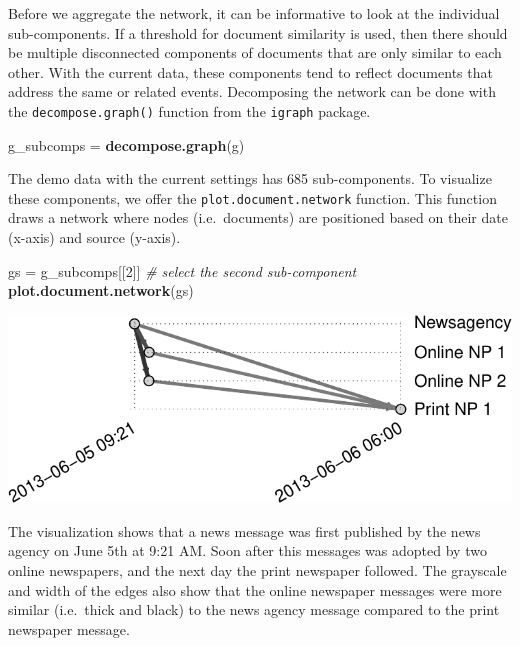 \documentclass[]{article}
\newenvironment{Shaded}{\begin{snugshade}}{\end{snugshade}}
\newcommand{\KeywordTok}[1]{\textcolor[rgb]{0.13,0.29,0.53}{\textbf{{#1}}}}
\newcommand{\DecValTok}[1]{\textcolor[rgb]{0.00,0.00,0.81}{{#1}}}
\newcommand{\StringTok}[1]{\textcolor[rgb]{0.31,0.60,0.02}{{#1}}}
\newcommand{\CommentTok}[1]{\textcolor[rgb]{0.56,0.35,0.01}{\textit{{#1}}}}
\newcommand{\NormalTok}[1]{{#1}}
\begin{document}
Before we aggregate the network, it can be informative to look at the
individual sub-components. If a threshold for document similarity is
used, then there should be multiple disconnected components of documents
that are only similar to each other. With the current data, these
components tend to reflect documents that address the same or related
events. Decomposing the network can be done with the
\texttt{decompose.graph()} function from the \texttt{igraph} package.

\begin{Shaded}
\begin{Highlighting}[]
\NormalTok{g_subcomps =}\StringTok{ }\KeywordTok{decompose.graph}\NormalTok{(g)}
\end{Highlighting}
\end{Shaded}

The demo data with the current settings has 685 sub-components. To
visualize these components, we offer the \texttt{plot.document.network}
function. This function draws a network where nodes (i.e.~documents) are
positioned based on their date (x-axis) and source (y-axis).

\begin{Shaded}
\begin{Highlighting}[]
\NormalTok{gs =}\StringTok{ }\NormalTok{g_subcomps[[}\DecValTok{2}\NormalTok{]] }\CommentTok{# select the second sub-component}
\KeywordTok{plot.document.network}\NormalTok{(gs)}
\end{Highlighting}
\end{Shaded}

\includegraphics{vignette_files/figure-latex/unnamed-chunk-15-1.pdf}

The visualization shows that a news message was first published by the
news agency on June 5th at 9:21 AM. Soon after this messages was adopted
by two online newspapers, and the next day the print newspaper followed.
The grayscale and width of the edges also show that the online newspaper
messages were more similar (i.e.~thick and black) to the news agency
message compared to the print newspaper message.
\end{document}
